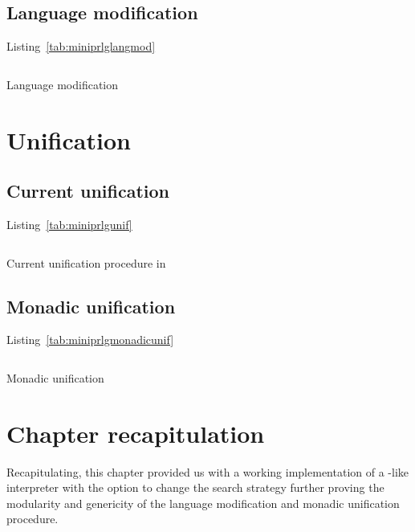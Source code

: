 \documentclass[thesis-solanki.tex]{files}
\begin{document}
\subsection{Language modification}
Listing~\ref{tab:miniprlglangmod}

\begin{code-list}[H]
\begin{singlespace}
  \inputminted[linenos, firstline=64, lastline=87]{haskell}{haskell-proto3-uplift-apart.hs}
\end{singlespace}
\caption{Language modification}
\label{tab:miniprlglangmod}
\end{code-list}

\section{Unification}

\subsection{Current unification}
Listing~\ref{tab:miniprlgunif}
\begin{code-list}[H]
\begin{singlespace}
  \inputminted[linenos, firstline=65, lastline=82]{haskell}{haskell-proto3-pentyl-skater.hs}
\end{singlespace}
\caption{Current unification procedure in \cite{website:mini-prolog-hugs98}}
\label{tab:miniprlgunif}
\end{code-list}

\subsection{Monadic unification}
Listing~\ref{tab:miniprlgmonadicunif}
\begin{code-list}[H]
\begin{singlespace}
  \inputminted[linenos, firstline=1, lastline=41]{haskell}{haskell-proto3-bevy-icebox.hs}
\end{singlespace}
\caption{Monadic unification}
\label{tab:miniprlgmonadicunif}
\end{code-list}



\section{Chapter recapitulation}
Recapitulating, this chapter provided us with a working implementation of a -like interpreter with the option to change
the search strategy further proving the modularity and genericity of the language modification and monadic unification procedure.
\end{document}
